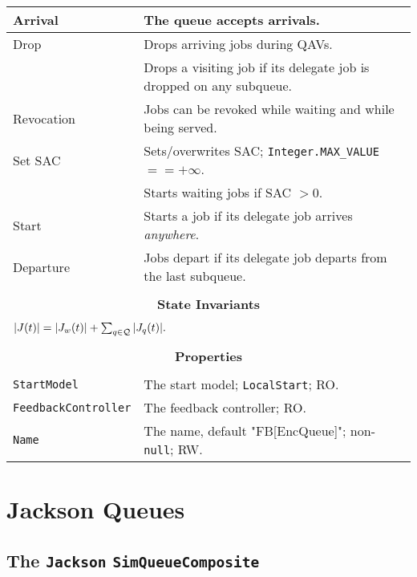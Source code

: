 \begin{tabular}{|l|l|}
	\hline
	Arrival & The queue accepts arrivals. \\
	\hline
	Drop & Drops arriving jobs during QAVs. \\
	& Drops a visiting job if its delegate job is dropped on any subqueue. \\
	\hline
	Revocation & Jobs can be revoked while waiting and while being served. \\
	\hline
	Set SAC & Sets/overwrites SAC; \lstinline|Integer.MAX_VALUE| $== +\infty$. \\
	& Starts waiting jobs if SAC $> 0$. \\
	\hline
	Start & Starts a job if its delegate job arrives {\em anywhere}. \\
	\hline
	Departure & Jobs depart if its delegate job departs from the last subqueue. \\
	\hline
	\multicolumn{2}{|c|}{} \\
	\multicolumn{2}{|c|}{\bf State  Invariants} \\
	\multicolumn{2}{|c|}{} \\
	\hline
	\multicolumn{2}{|l|}{$|J(t)| = |J_{w}(t)| + \sum_{q \in \cal{Q}} |J_{q}(t)|.$} \\
	\hline
	\multicolumn{2}{|c|}{} \\
	\multicolumn{2}{|c|}{\bf Properties} \\
	\multicolumn{2}{|c|}{} \\
	\hline
	\lstinline|StartModel| & The start model; \lstinline|LocalStart|; RO. \\
	\hline
	\lstinline|FeedbackController|    & The feedback controller; RO. \\
	\hline
	\lstinline|Name|       & The name, default "FB[EncQueue]"; non-\lstinline|null|; RW. \\
	\hline
\end{tabular}

\section{Jackson Queues}

\subsection{The \lstinline{Jackson} \lstinline{SimQueueComposite}}
\label{sec:Jackson}

